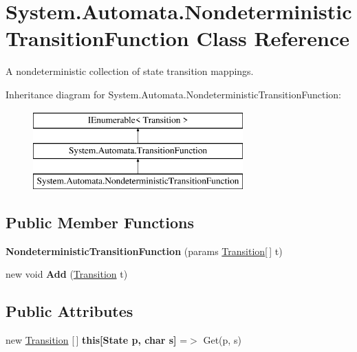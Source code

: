 \hypertarget{class_system_1_1_automata_1_1_nondeterministic_transition_function}{}\section{System.\+Automata.\+Nondeterministic\+Transition\+Function Class Reference}
\label{class_system_1_1_automata_1_1_nondeterministic_transition_function}


A nondeterministic collection of state transition mappings.  


Inheritance diagram for System.\+Automata.\+Nondeterministic\+Transition\+Function\+:\begin{figure}[H]
\begin{center}
\leavevmode
\includegraphics[height=3.000000cm]{class_system_1_1_automata_1_1_nondeterministic_transition_function}
\end{center}
\end{figure}
\subsection*{Public Member Functions}
\begin{DoxyCompactItemize}
\item 
\mbox{\label{class_system_1_1_automata_1_1_nondeterministic_transition_function_a0099045f999ab2035909872f4e3e9594}} 
{\bfseries Nondeterministic\+Transition\+Function} (params \mbox{\hyperlink{class_system_1_1_automata_1_1_transition}{Transition}}\mbox{[}$\,$\mbox{]} t)
\item 
\mbox{\label{class_system_1_1_automata_1_1_nondeterministic_transition_function_a57a2565385a005f0900b37c1b2085bfe}} 
new void {\bfseries Add} (\mbox{\hyperlink{class_system_1_1_automata_1_1_transition}{Transition}} t)
\end{DoxyCompactItemize}
\subsection*{Public Attributes}
\begin{DoxyCompactItemize}
\item 
\mbox{\label{class_system_1_1_automata_1_1_nondeterministic_transition_function_aac5e108e3c807915075806a0788f2c97}} 
new \mbox{\hyperlink{class_system_1_1_automata_1_1_transition}{Transition}} \mbox{[}$\,$\mbox{]} {\bfseries this\mbox{[}\+State p, char s\mbox{]}} =$>$ Get(p, s)
\end{DoxyCompactItemize}
